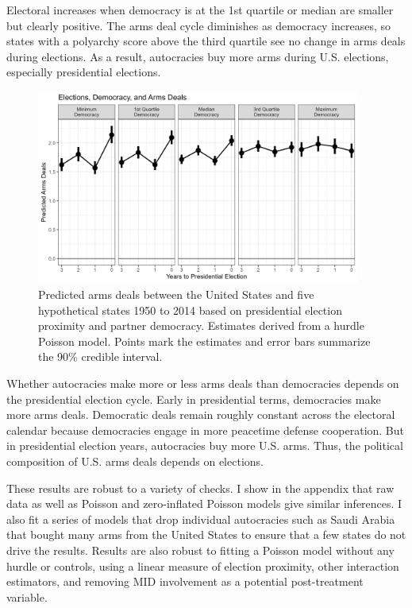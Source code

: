 \documentclass[12pt]{article}
\begin{document}
Electoral increases when democracy is at the 1st quartile or median are smaller but clearly positive.
The arms deal cycle diminishes as democracy increases, so states with a polyarchy score above the third quartile see no change in arms deals during elections.
As a result, autocracies buy more arms during U.S. elections, especially presidential elections.


\begin{figure}[htpb]
	\centering
		\includegraphics[width=0.95\textwidth]{../figures/democ-deals-pred.png}
	\caption{Predicted arms deals between the United States and five hypothetical states 1950 to 2014 based on presidential election proximity and partner democracy. Estimates derived from a hurdle Poisson model. Points mark the estimates and error bars summarize the 90\% credible interval.}
	\label{fig:democ-deals-pred}
\end{figure}


Whether autocracies make more or less arms deals than democracies depends on the presidential election cycle. 
Early in presidential terms, democracies make more arms deals. 
Democratic deals remain roughly constant across the electoral calendar because democracies engage in more peacetime defense cooperation. 
But in presidential election years, autocracies buy more U.S. arms. 
Thus, the political composition of U.S. arms deals depends on elections. 


These results are robust to a variety of checks. 
I show in the appendix that raw data as well as Poisson and zero-inflated Poisson models give similar inferences. 
I also fit a series of models that drop individual autocracies such as Saudi Arabia that bought many arms from the United States to ensure that a few states do not drive the results. 
Results are also robust to fitting a Poisson model without any hurdle or controls, using a linear measure of election proximity, other interaction estimators, and removing MID involvement as a potential post-treatment variable. 
\end{document}
